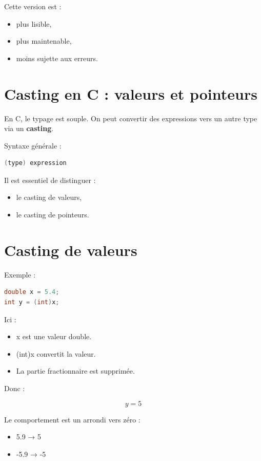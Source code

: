 Cette version est :

\begin{itemize}
\item plus lisible,
\item plus maintenable,
\item moins sujette aux erreurs.
\end{itemize}

\section{Casting en C : valeurs et pointeurs}

En C, le typage est souple.  
On peut convertir des expressions vers un autre type via un \textbf{casting}.

Syntaxe générale :

\begin{lstlisting}[language=C]
(type) expression
\end{lstlisting}

Il est essentiel de distinguer :

\begin{itemize}
\item le casting de valeurs,
\item le casting de pointeurs.
\end{itemize}

\section{Casting de valeurs}

Exemple :

\begin{lstlisting}[language=C]
double x = 5.4;
int y = (int)x;
\end{lstlisting}

Ici :

\begin{itemize}
\item x est une valeur double.
\item (int)x convertit la valeur.
\item La partie fractionnaire est supprimée.
\end{itemize}

Donc :

\[
y = 5
\]

Le comportement est un arrondi vers zéro :

\begin{itemize}
\item 5.9 → 5
\item -5.9 → -5
\end{itemize}

